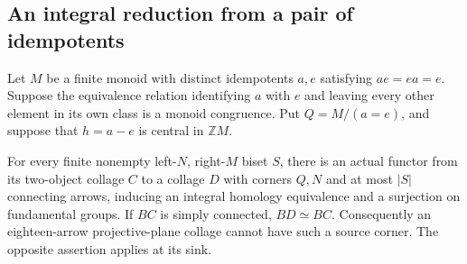 \subsection{An integral reduction from a pair of idempotents}

\begin{theorem}[Proved]
\label{CP2:A-idempotent-pair-integral-reduction}
Let $M$ be a finite monoid with distinct idempotents $a,e$ satisfying
$ae=ea=e$.  Suppose the equivalence relation identifying $a$ with $e$
and leaving every other element in its own class is a monoid
congruence.  Put $Q=M/(a=e)$, and suppose that $h=a-e$ is central
in $\mathbb ZM$.

For every finite nonempty left-$N$, right-$M$ biset $S$, there is
an actual functor from its two-object collage $C$ to a collage $D$
with corners $Q,N$ and at most $|S|$ connecting arrows, inducing
an integral homology equivalence and a surjection on fundamental
groups.  If $BC$ is simply connected, $BD\simeq BC$.
Consequently an eighteen-arrow projective-plane collage cannot have
such a source corner.  The opposite assertion applies at its sink.
\end{theorem}
